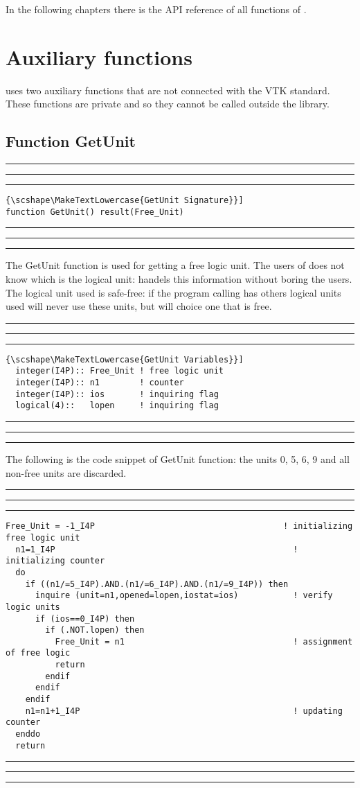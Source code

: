 \documentclass[pagesize=pdftex,fontsize=10pt,paper=a4,oneside]{scrbook}
\DeclareRobustCommand{\MarginNote}[1]{\marginpar{%
\slshape\footnotesize%
\parindent=0pt\lineskip=0pt\lineskiplimit=0pt%
\tolerance=2000\hyphenpenalty=300\exhyphenpenalty=300%
\doublehyphendemerits=100000\finalhyphendemerits=\doublehyphendemerits%
\raggedright\hspace{0pt}#1}}
\newenvironment{boxred}[1]%
               {%
                \noindent\hspace*{-0.025\textwidth}%
                \color{Maroon}%
                \rule[-5.8pt]{0.6pt}{6pt}\hspace*{-0.6pt}\rule{1.05\textwidth}{0.6pt}\hspace*{-0.6pt}\rule[-5.8pt]{0.6pt}{6pt}%
                \color{black}%
                \vspace*{0.6pt}\MarginNote{\color{Maroon}{#1}}%
               }%
               {%
                \noindent\hspace*{-0.025\textwidth}%
                \color{Maroon}%
                \rule[0pt]{0.6pt}{6pt}\hspace*{-0.6pt}\rule{1.05\textwidth}{0.6pt}\hspace*{-0.6pt}\rule[0pt]{0.6pt}{6pt}%
                \color{black}%
                \vspace*{2mm}%
               }
\DeclareRobustCommand{\MaiuscolettoBS}[1]{\textls[80]{\scshape\MakeTextLowercase{#1}}}
\begin{document}
In the following chapters there is the API reference of all functions of \LIBVTKIO.
\chapter{Auxiliary functions}
\minitoc
\vspace*{8mm}

\LIBVTKIO uses two auxiliary functions that are not connected with the VTK standard. These functions are private and so they
cannot be called outside the library.
\section{Function GetUnit}
\label{fun:GetUnit}
 
 
\begin{boxred}{}
\begin{lstlisting}[style=signature,title=\color{Maroon}\MaiuscolettoBS{GetUnit Signature}]
function GetUnit() result(Free_Unit)
\end{lstlisting}
\end{boxred}
 
The GetUnit function is used for getting a free logic unit. The users of \LIBVTKIO does not know which is
the logical unit: \LIBVTKIO handels this information without boring the users. The logical unit used is safe-free: if the
program calling \LIBVTKIO has others logical units used \LIBVTKIO will never use these units, but will choice one that is free.


 
\begin{boxred}{}
\begin{lstlisting}[style=variables,title=\color{Maroon}\MaiuscolettoBS{GetUnit Variables}]
  integer(I4P):: Free_Unit ! free logic unit
  integer(I4P):: n1        ! counter
  integer(I4P):: ios       ! inquiring flag
  logical(4)::   lopen     ! inquiring flag

\end{lstlisting}

\end{boxred}
 
The following is the code snippet of GetUnit function: the units 0, 5, 6, 9 and all non-free units are discarded.

 
\begin{boxred}{GetUnit Code Snippet}
\begin{lstlisting}[firstnumber=   236,style=codeFootnotesize]
  Free_Unit = -1_I4P                                      ! initializing free logic unit
  n1=1_I4P                                                ! initializing counter
  do
    if ((n1/=5_I4P).AND.(n1/=6_I4P).AND.(n1/=9_I4P)) then
      inquire (unit=n1,opened=lopen,iostat=ios)           ! verify logic units
      if (ios==0_I4P) then
        if (.NOT.lopen) then
          Free_Unit = n1                                  ! assignment of free logic
          return
        endif
      endif
    endif
    n1=n1+1_I4P                                           ! updating counter
  enddo
  return
\end{lstlisting}

\end{boxred}
 
\end{document}
